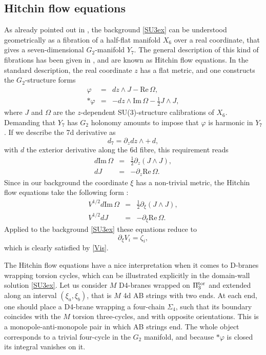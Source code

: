 \documentclass[11pt]{article}
\def\be{\begin{equation}}
\def\ee{\end{equation}}
\def\bea{\begin{eqnarray}}
\def\eea{\end{eqnarray}}
\def\oh{\frac{1}{2}}
\def\re{\mbox{Re}\, }
\def\im{\mbox{Im}\, }
\def\Om{\Omega}
\def\p {{\partial}}
\begin{document}
\subsection{Hitchin flow equations}
\label{ss:hitchin}

As already pointed out in \cite{Gurrieri:2002wz}, the background \eqref{SU3ex} can be understood geometrically as a fibration of a half-flat manifold $X_6$ over a real coordinate, that gives a seven-dimensional $G_2$-manifold $Y_7$. The general description of this kind of fibrations has been given in \cite{hitchin2001stable,chiossi2002intrinsic}, and are known as Hitchin flow equations. In the standard description, the real coordinate $z$ has a flat metric, and one constructs the $G_2$-structure forms
\bea
\varphi & = & dz \wedge J  - {\re \Om} , \\
*\varphi & = & -dz \wedge {\im \Om} - \oh J \wedge J ,
\eea
where $J$ and $\Om$ are the $z$-dependent SU(3)-structure calibrations of $X_6$. Demanding that  $Y_7$ has $G_2$ holonomy amounts to impose that $\varphi$ is harmonic in $Y_7$. If we describe the 7d derivative as 
\be
d_7 = \p_z  dz \wedge  + \, d ,
\ee 
with $d$ the exterior derivative along the 6d fibre, this requirement reads
\bea
\label{dreom}
d {\im \Om} & = & \oh\p_z \left(J \wedge J\right) , \\
d J & = & - \p_z {\re \Om} .
\label{dj}
\eea
Since in our background the coordinate $\xi$ has a non-trivial metric, the Hitchin flow equations take the following form :
\bea
\label{dreomxi}
V^{1/2} d {\im \Om} & = & \oh \p_\xi \left(J \wedge J\right) , \\
V^{1/2} d J & = & - \p_\xi {\re \Om} . 
\label{djxi}
\eea
Applied to the background \eqref{SU3ex} these equations reduce to
\be
\p_\xi V_i  =  \zeta_i ,
\ee
which is clearly satisfied by \eqref{Vis}.


The Hitchin flow equations have a nice interpretation when it comes to D-branes wrapping torsion cycles, which can be illustrated explicitly in the domain-wall solution \eqref{SU3ex}. Let us consider $M$ D4-branes wrapped on $\Pi_3^{\rm tor}$ and extended along an interval $(\xi_a, \xi_b)$, that is $M$ 4d AB strings with two ends. At each end, one should place a D4-brane wrapping a four-chain $\Sigma_4$, such that its boundary coincides with the $M$ torsion three-cycles, and with opposite orientations. This is a monopole-anti-monopole pair in which AB strings end. The whole object corresponds to a trivial four-cycle in the $G_2$ manifold, and because $*\varphi$ is closed its integral vanishes on it.
\end{document}
